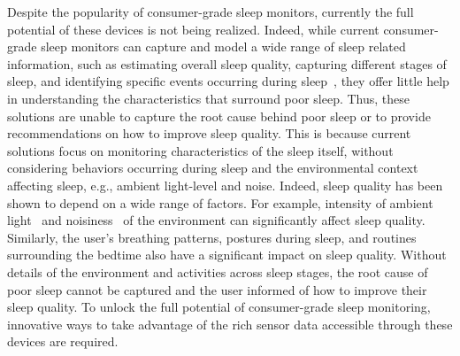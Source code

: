 Despite the popularity of consumer-grade sleep monitors, currently the full potential of these devices is not being realized. Indeed, while current consumer-grade sleep monitors can capture and model a wide range of sleep related information, such as estimating overall sleep quality, capturing different stages of sleep, and identifying specific events occurring during
sleep~\cite{kay2012lullaby,zhang2013real,sleepmonitor}, they offer little help in understanding the characteristics that surround poor sleep. Thus, these solutions are unable to capture the root cause behind poor sleep or to provide  recommendations on how to improve sleep quality. This is because current solutions focus on monitoring characteristics of the sleep itself, without considering behaviors occurring during sleep and the environmental context affecting sleep, e.g., ambient light-level and noise. Indeed, sleep quality has been shown to depend on a wide range of factors. For example, intensity of ambient light~\cite{hood04determinants} and noisiness~\cite{muzet2007environmental} of the environment can significantly affect sleep quality. Similarly, the user's breathing patterns, postures during sleep, and routines surrounding the bedtime also have a significant impact on sleep quality. Without details of the environment and activities across sleep stages, the root cause of poor sleep cannot be captured and the user informed of how to improve their sleep quality. To unlock the full potential of consumer-grade sleep monitoring, innovative ways to take advantage of the rich sensor data accessible through these devices are required.

